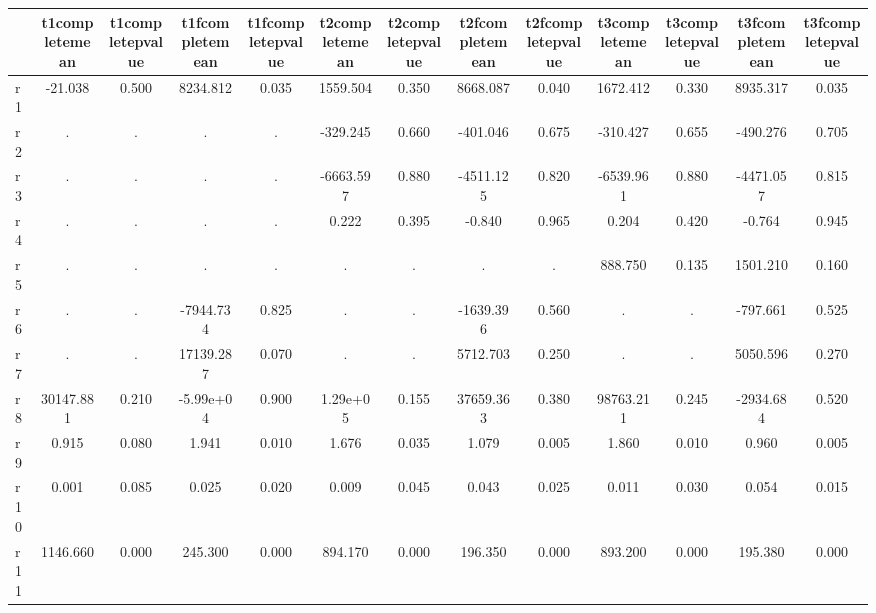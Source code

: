 \begin{table}[htbp]
\begin{tabular}{lcccccccccccc} \hline \hline
 & t1completemean  & t1completepvalue  & t1fcompletemean  & t1fcompletepvalue  & t2completemean  & t2completepvalue  & t2fcompletemean  & t2fcompletepvalue  & t3completemean  & t3completepvalue  & t3fcompletemean  & t3fcompletepvalue  \\  \hline 
r1 &   -21.038 &     0.500 &  8234.812 &     0.035 &  1559.504 &     0.350 &  8668.087 &     0.040 &  1672.412 &     0.330 &  8935.317 &     0.035 \\  
r2 &         . &         . &         . &         . &  -329.245 &     0.660 &  -401.046 &     0.675 &  -310.427 &     0.655 &  -490.276 &     0.705 \\  
r3 &         . &         . &         . &         . & -6663.597 &     0.880 & -4511.125 &     0.820 & -6539.961 &     0.880 & -4471.057 &     0.815 \\  
r4 &         . &         . &         . &         . &     0.222 &     0.395 &    -0.840 &     0.965 &     0.204 &     0.420 &    -0.764 &     0.945 \\  
r5 &         . &         . &         . &         . &         . &         . &         . &         . &   888.750 &     0.135 &  1501.210 &     0.160 \\  
r6 &         . &         . & -7944.734 &     0.825 &         . &         . & -1639.396 &     0.560 &         . &         . &  -797.661 &     0.525 \\  
r7 &         . &         . & 17139.287 &     0.070 &         . &         . &  5712.703 &     0.250 &         . &         . &  5050.596 &     0.270 \\  
r8 & 30147.881 &     0.210 & -5.99e+04 &     0.900 &  1.29e+05 &     0.155 & 37659.363 &     0.380 & 98763.211 &     0.245 & -2934.684 &     0.520 \\  
r9 &     0.915 &     0.080 &     1.941 &     0.010 &     1.676 &     0.035 &     1.079 &     0.005 &     1.860 &     0.010 &     0.960 &     0.005 \\  
r10 &     0.001 &     0.085 &     0.025 &     0.020 &     0.009 &     0.045 &     0.043 &     0.025 &     0.011 &     0.030 &     0.054 &     0.015 \\  
r11 &  1146.660 &     0.000 &   245.300 &     0.000 &   894.170 &     0.000 &   196.350 &     0.000 &   893.200 &     0.000 &   195.380 &     0.000 \\  
\hline \hline \end{tabular}
\end{table}
